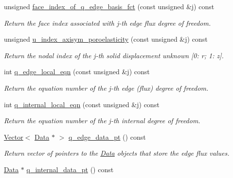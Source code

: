\begin{DoxyCompactItemize}
unsigned \hyperlink{classoomph_1_1TAxisymmetricPoroelasticityElement_ac7f6238d6a5734895b6b04812873e66a}{face\+\_\+index\+\_\+of\+\_\+q\+\_\+edge\+\_\+basis\+\_\+fct} (const unsigned \&j) const
\begin{DoxyCompactList}\small\item\em Return the face index associated with j-\/th edge flux degree of freedom. \end{DoxyCompactList}\item 
unsigned \hyperlink{classoomph_1_1TAxisymmetricPoroelasticityElement_adcfaa53074c4710fa4c4d34ce37d326c}{u\+\_\+index\+\_\+axisym\+\_\+poroelasticity} (const unsigned \&j) const
\begin{DoxyCompactList}\small\item\em Return the nodal index of the j-\/th solid displacement unknown \mbox{[}0\+: r; 1\+: z\mbox{]}. \end{DoxyCompactList}\item 
int \hyperlink{classoomph_1_1TAxisymmetricPoroelasticityElement_ac6fcfbad57e73d5f6bacff687a67df4b}{q\+\_\+edge\+\_\+local\+\_\+eqn} (const unsigned \&j) const
\begin{DoxyCompactList}\small\item\em Return the equation number of the j-\/th edge (flux) degree of freedom. \end{DoxyCompactList}\item 
int \hyperlink{classoomph_1_1TAxisymmetricPoroelasticityElement_ae13e181da7a330ebe62cc51d50584942}{q\+\_\+internal\+\_\+local\+\_\+eqn} (const unsigned \&j) const
\begin{DoxyCompactList}\small\item\em Return the equation number of the j-\/th internal degree of freedom. \end{DoxyCompactList}\item 
\hyperlink{classoomph_1_1Vector}{Vector}$<$ \hyperlink{classoomph_1_1Data}{Data} $\ast$ $>$ \hyperlink{classoomph_1_1TAxisymmetricPoroelasticityElement_af13ce25c9c2d1a907690319576631b87}{q\+\_\+edge\+\_\+data\+\_\+pt} () const
\begin{DoxyCompactList}\small\item\em Return vector of pointers to the \hyperlink{classoomph_1_1Data}{Data} objects that store the edge flux values. \end{DoxyCompactList}\item 
\hyperlink{classoomph_1_1Data}{Data} $\ast$ \hyperlink{classoomph_1_1TAxisymmetricPoroelasticityElement_a294374f01ed46c7ea77553234bb37c88}{q\+\_\+internal\+\_\+data\+\_\+pt} () const

\end{DoxyCompactItemize}

